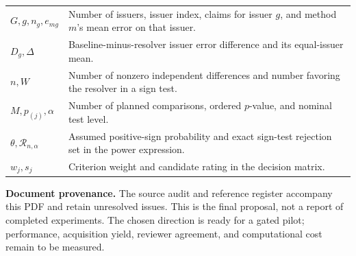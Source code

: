 \documentclass[11pt,a4paper]{article}
\newcommand{\lead}[1]{\textbf{\color{navy}#1}}
\begin{document}
\begin{table}[H]
\begin{tabularx}{\linewidth}{p{.24\linewidth}Y}
$G,g,n_g,e_{mg}$ & Number of issuers, issuer index, claims for issuer $g$, and method $m$'s mean error on that issuer.\\
$D_g,\Delta$ & Baseline-minus-resolver issuer error difference and its equal-issuer mean.\\
$n,W$ & Number of nonzero independent differences and number favoring the resolver in a sign test.\\
$M,p_{(j)},\alpha$ & Number of planned comparisons, ordered $p$-value, and nominal test level.\\
$\theta,\mathcal R_{n,\alpha}$ & Assumed positive-sign probability and exact sign-test rejection set in the power expression.\\
$w_j,s_j$ & Criterion weight and candidate rating in the decision matrix.\\\bottomrule
\end{tabularx}\end{table}

\lead{Document provenance.} The source audit and reference register accompany this PDF and retain unresolved issues. This is the final proposal, not a report of completed experiments. The chosen direction is ready for a gated pilot; performance, acquisition yield, reviewer agreement, and computational cost remain to be measured.
\end{document}
